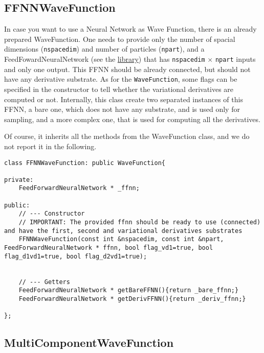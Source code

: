 \documentclass[11pt,a4paper,twoside]{article}
\begin{document}
\subsection{FFNNWaveFunction} %
\label{sub:ffnnwavefunction}

In case you want to use a Neural Network as Wave Function, there is an already prepared WaveFunction.
One needs to provide only the number of spacial dimensions (\verb+nspacedim+) and number of particles (\verb+npart+), and a FeedFowardNeuralNetwork (see the \href{https://github.com/francesco086/FeedForwardNeuralNetwork}{library}) that has \verb+nspacedim+ $\times$ \verb+npart+ inputs and only one output.
This FFNN should be already connected, but should not have any derivative substrate.
As for the \verb+WaveFunction+, some flags can be specified in the constructor to tell whether the variational derivatives are computed or not.
Internally, this class create two separated instances of this FFNN, a bare one, which does not have any substrate, and is used only for sampling, and a more complex one, that is used for computing all the derivatives.

Of course, it inherits all the methods from the WaveFunction class, and we do not report it in the following.

\begin{lstlisting}
class FFNNWaveFunction: public WaveFunction{

private:
    FeedForwardNeuralNetwork * _ffnn;

public:
    // --- Constructor
    // IMPORTANT: The provided ffnn should be ready to use (connected) and have the first, second and variational derivatives substrates
    FFNNWaveFunction(const int &nspacedim, const int &npart, FeedForwardNeuralNetwork * ffnn, bool flag_vd1=true, bool flag_d1vd1=true, bool flag_d2vd1=true);


    // --- Getters
    FeedForwardNeuralNetwork * getBareFFNN(){return _bare_ffnn;}
    FeedForwardNeuralNetwork * getDerivFFNN(){return _deriv_ffnn;}

};
\end{lstlisting}







\subsection{MultiComponentWaveFunction}
\label{sub:multicomponentwavefunction}
\end{document}
